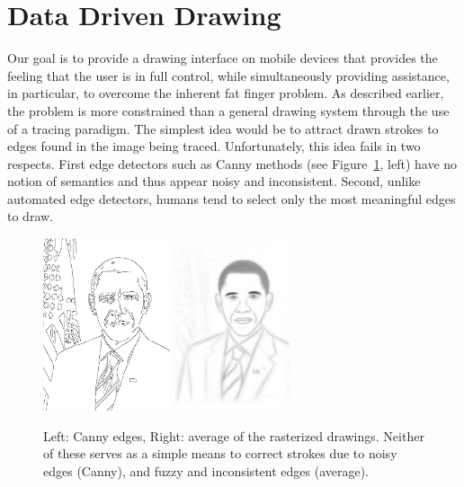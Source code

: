 \section{Data Driven Drawing}



Our goal is to provide a drawing interface on mobile devices that provides the feeling that the user is in full control, while simultaneously providing assistance, in particular, to overcome the inherent fat finger problem. As described earlier, the problem is more constrained than a general drawing system through the use of a tracing paradigm. The simplest idea would be to attract drawn strokes to edges found in the image being traced. Unfortunately, this idea fails in two respects. First edge detectors such as Canny methods (see Figure~\ref{fig:edges}, left) have no notion of semantics and thus appear noisy and inconsistent. Second, unlike automated edge detectors, humans tend to select only the most meaningful edges to draw.

\begin{figure}
  \centering%
\includegraphics[height=2in]{figures/imagetable/edges_bo.png}
\hspace{0.1in}
\includegraphics[height=2in]{figures/imagetable/avg_bo.png}
  \caption{Left: Canny edges, Right: average of the rasterized drawings. Neither of these serves as a simple means to correct strokes due to noisy edges (Canny), and fuzzy and inconsistent edges (average).}
  \label{fig:edges}
\end{figure}

